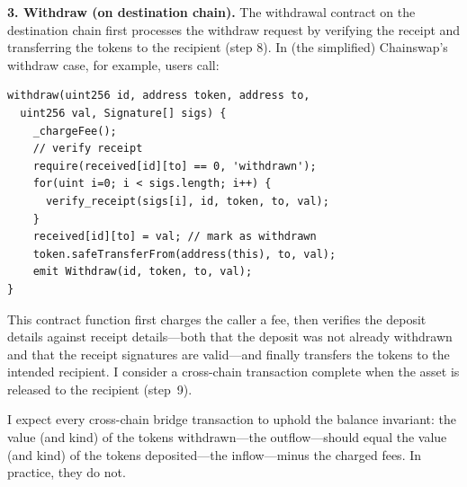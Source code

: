 \textbf{3. Withdraw (on destination chain).}
The withdrawal contract on the destination chain first processes the withdraw
request by verifying the receipt and transferring the tokens to the recipient
(step 8). In (the simplified) Chainswap's withdraw case, for example, users call:
\begin{lstlisting}
withdraw(uint256 id, address token, address to, 
  uint256 val, Signature[] sigs) {
    _chargeFee();
    // verify receipt
    require(received[id][to] == 0, 'withdrawn');
    for(uint i=0; i < sigs.length; i++) {
      verify_receipt(sigs[i], id, token, to, val);
    }
    received[id][to] = val; // mark as withdrawn
    token.safeTransferFrom(address(this), to, val);
    emit Withdraw(id, token, to, val);
}
\end{lstlisting}
This contract function first charges the caller a fee, then verifies the
deposit details against receipt details---both that the deposit was not already
withdrawn and that the receipt signatures are valid---and finally transfers the
tokens to the intended recipient.  I consider a cross-chain transaction
complete when the asset is released to the recipient (step~9).

I expect every cross-chain bridge transaction to uphold the balance invariant:
the value (and kind) of the tokens withdrawn---the outflow---should equal the
value (and kind) of the tokens deposited---the inflow---minus the charged fees.
In practice, they do not.




